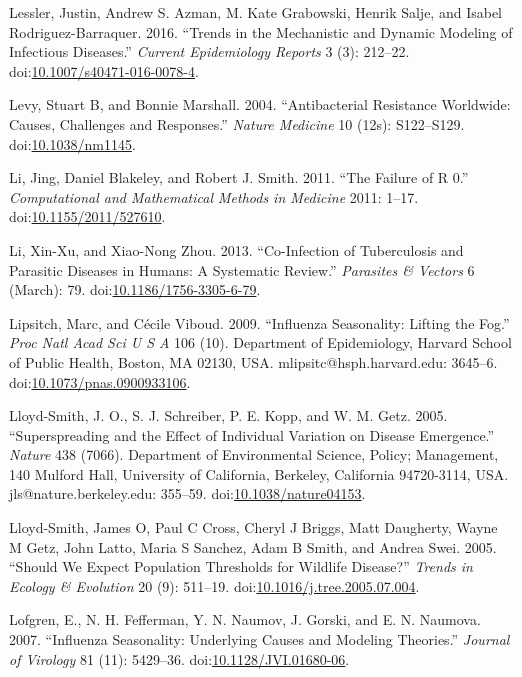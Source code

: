 \documentclass[]{article}
\theoremstyle{definition}
\theoremstyle{definition}
\theoremstyle{definition}
\theoremstyle{remark}
\begin{document}
\hypertarget{ref-lessler16}{}
Lessler, Justin, Andrew S. Azman, M. Kate Grabowski, Henrik Salje, and
Isabel Rodriguez-Barraquer. 2016. ``Trends in the Mechanistic and
Dynamic Modeling of Infectious Diseases.'' \emph{Current Epidemiology
Reports} 3 (3): 212--22.
doi:\href{https://doi.org/10.1007/s40471-016-0078-4}{10.1007/s40471-016-0078-4}.

\hypertarget{ref-levy04}{}
Levy, Stuart B, and Bonnie Marshall. 2004. ``Antibacterial Resistance
Worldwide: Causes, Challenges and Responses.'' \emph{Nature Medicine} 10
(12s): S122--S129.
doi:\href{https://doi.org/10.1038/nm1145}{10.1038/nm1145}.

\hypertarget{ref-li11}{}
Li, Jing, Daniel Blakeley, and Robert J. Smith. 2011. ``The Failure of R
0.'' \emph{Computational and Mathematical Methods in Medicine} 2011:
1--17.
doi:\href{https://doi.org/10.1155/2011/527610}{10.1155/2011/527610}.

\hypertarget{ref-li13}{}
Li, Xin-Xu, and Xiao-Nong Zhou. 2013. ``Co-Infection of Tuberculosis and
Parasitic Diseases in Humans: A Systematic Review.'' \emph{Parasites \&
Vectors} 6 (March): 79.
doi:\href{https://doi.org/10.1186/1756-3305-6-79}{10.1186/1756-3305-6-79}.

\hypertarget{ref-lipsitch09}{}
Lipsitch, Marc, and Cécile Viboud. 2009. ``Influenza Seasonality:
Lifting the Fog.'' \emph{Proc Natl Acad Sci U S A} 106 (10). Department
of Epidemiology, Harvard School of Public Health, Boston, MA 02130, USA.
mlipsitc@hsph.harvard.edu: 3645--6.
doi:\href{https://doi.org/10.1073/pnas.0900933106}{10.1073/pnas.0900933106}.

\hypertarget{ref-lloyd-smith05}{}
Lloyd-Smith, J. O., S. J. Schreiber, P. E. Kopp, and W. M. Getz. 2005.
``Superspreading and the Effect of Individual Variation on Disease
Emergence.'' \emph{Nature} 438 (7066). Department of Environmental
Science, Policy; Management, 140 Mulford Hall, University of California,
Berkeley, California 94720-3114, USA. jls@nature.berkeley.edu: 355--59.
doi:\href{https://doi.org/10.1038/nature04153}{10.1038/nature04153}.

\hypertarget{ref-lloyd-smith05b}{}
Lloyd-Smith, James O, Paul C Cross, Cheryl J Briggs, Matt Daugherty,
Wayne M Getz, John Latto, Maria S Sanchez, Adam B Smith, and Andrea
Swei. 2005. ``Should We Expect Population Thresholds for Wildlife
Disease?'' \emph{Trends in Ecology \& Evolution} 20 (9): 511--19.
doi:\href{https://doi.org/10.1016/j.tree.2005.07.004}{10.1016/j.tree.2005.07.004}.

\hypertarget{ref-lofgren07}{}
Lofgren, E., N. H. Fefferman, Y. N. Naumov, J. Gorski, and E. N.
Naumova. 2007. ``Influenza Seasonality: Underlying Causes and Modeling
Theories.'' \emph{Journal of Virology} 81 (11): 5429--36.
doi:\href{https://doi.org/10.1128/JVI.01680-06}{10.1128/JVI.01680-06}.
\end{document}
